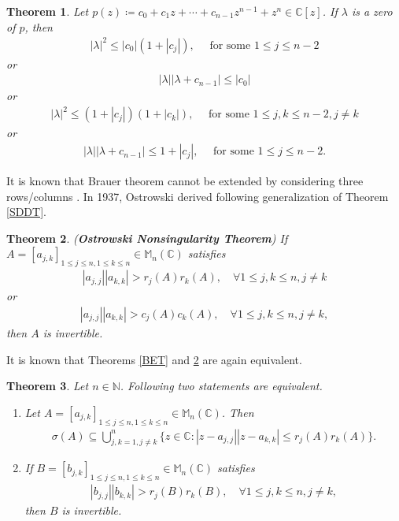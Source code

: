 \documentclass{amsart}
\newtheorem{theorem}{Theorem}[section]
\begin{document}
\begin{theorem} 
	Let $p(z)\coloneqq c_0+c_1z+\cdots +c_{n-1}z^{n-1}+z^n \in \mathbb{C}[z]$.  If $\lambda$ is a  zero of $p$, then 
\begin{align*}
	|\lambda|^2\leq |c_0|(1+|c_j|),  \quad \text{ for some } 1\leq j \leq n-2
\end{align*}
or 
\begin{align*}
	|\lambda||\lambda +c_{n-1}|\leq |c_0|
\end{align*}
or 
\begin{align*}
	|\lambda|^2\leq (1+|c_{j}|)(1+|c_{k}|), \quad \text{ for some } 1\leq j, k \leq n-2, j \neq k
\end{align*}
or 
\begin{align*}
	|\lambda||\lambda +c_{n-1}|\leq 1+|c_{j}|, \quad \text{ for some } 1\leq j \leq n-2.
\end{align*}
\end{theorem}
It is known that Brauer theorem cannot be extended by considering three rows/columns \cite{VARGA}.  
In 1937, Ostrowski derived following generalization of Theorem \ref{SDDT}.
\begin{theorem} \cite{VARGA, OSTROWSKI} \label{ONT} (\textbf{Ostrowski Nonsingularity Theorem})
	If  $A=[a_{j,k}]_{1\leq j\leq n, 1\leq k \leq n}\in  \mathbb{M}_n(\mathbb{C})$ satisfies
	\begin{align*}
		|a_{j,j}||a_{k,k}|>r_j(A)r_k(A), \quad \forall 1\leq j, k \leq n, j \neq k
	\end{align*}
	or 
	\begin{align*}
		|a_{j,j}||a_{k,k}|>c_j(A)c_k(A), \quad \forall 1\leq j, k \leq n, j \neq k,
	\end{align*}
	then $A$ is invertible. 	
\end{theorem}
It is known that Theorems \ref{BET} and \ref{ONT} are again equivalent. 
\begin{theorem} \cite{VARGA}
	Let $n \in \mathbb{N}$.  Following two statements are equivalent. 
	\begin{enumerate}[\upshape(i)]
		\item Let $A=[a_{j,k}]_{1\leq j\leq n, 1\leq k \leq n}\in  \mathbb{M}_n(\mathbb{C})$. Then 
		\begin{align*}
			\sigma(A)\subseteq \bigcup_{j,k=1, j \neq k}^n\{z \in \mathbb{C}: |z-a_{j, j}||z-a_{k,k}|\leq r_j(A)r_k(A)\}.
		\end{align*}
		\item 	If  $B=[b_{j,k}]_{1\leq j\leq n, 1\leq k \leq n}\in  \mathbb{M}_n(\mathbb{C})$ satisfies
		\begin{align*}
			|b_{j,j}||b_{k,k}|>	r_j(B)r_k(B), \quad \forall 1\leq j, k \leq n, j \neq k,
		\end{align*}
		then $B$ is invertible. 
	\end{enumerate}	
\end{theorem}
\end{document}
